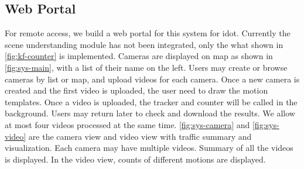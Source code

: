 

\subsection{Web Portal}
For remote access, we build a web portal for this system for \gls{idot}. Currently the scene understanding module has not been integrated, only the what shown in \ref{fig:kf-counter} is implemented.
Cameras are displayed on map as shown in \ref{fig:sys-main}, with a list of their name on the left. Users may create or browse cameras by list or map, and upload videos for each camera. Once a new camera is created and the first video is uploaded, the user need to draw the motion templates.
Once a video is uploaded, the tracker and counter will be called in the background. Users may return later to check and download the results. We allow at most four videos processed at the same time. 
\ref{fig:sys-camera} and \ref{fig:sys-video} are the camera view and video view with traffic summary and visualization. 
Each camera may have multiple videos. Summary of all the videos is displayed. In the video view, counts of different motions are displayed.

